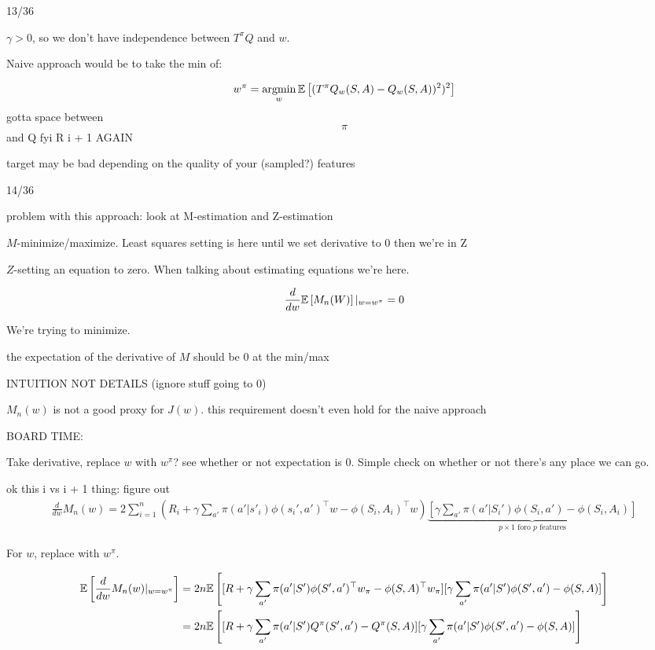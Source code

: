 \documentclass[11pt]{article}
\begin{document}
13/36

$\gamma > 0$, so we don't have independence between $T^\pi Q$ and $w$.

Naive approach would be to take the min of:

$$w^\pi = \operatorname*{argmin}_w \mathbb{E}\left[ (T^\pi Q_w(S,A) - Q_w(S,A))^2)^2 \right]$$
gotta space between $$\pi$$ and Q fyi
R i + 1 AGAIN


target may be bad depending on the quality of your (sampled?) features

14/36

problem with this approach: look at M-estimation and Z-estimation




$M$-minimize/maximize. Least squares setting is here until we set derivative to 0 then we're in Z

$Z$-setting an equation to zero. When talking about estimating equations we're here.


$$\frac{d}{dw}\mathbb{E}\left[ M_n(W) \right]|_{w=w^\pi} = 0$$

We're trying to minimize.

the expectation of the derivative of $M$ should be 0 at the min/max

INTUITION NOT DETAILS (ignore stuff going to 0)

$M_n(w)$ is not a good proxy for $J(w)$.
this requirement doesn't even hold for the naive approach



BOARD TIME:

Take derivative, replace $w$ with $w^\pi$? see whether or not expectation is 0. Simple check on whether or not there's any place we can go.

ok this i vs i + 1 thing: figure out
\begin{align*}
\frac{d}{dw}M_n(w) = 2\sum_{i=1}^n\left(R_{i} + \gamma \sum_{a'} \pi(a'|s'_{i})\phi(s_i', a')^\top w - \phi(S_i, A_i)^\top w \right)\underbrace{\left[\gamma \sum_{a'} \pi(a'|S_i')\phi(S_i, a') - \phi(S_i, A_i)\right]}_{\text{$p \times 1$ foro $p$ features}}
\end{align*}

For $w$, replace with $w^\pi$.

\begin{align*}
\mathbb{E}\left[ \frac{d}{dw} M_n(w) |_{w=w^\pi} \right] &=2n \mathbb{E}\left[ [R + \gamma \sum_{a'} \pi(a'|S')\phi(S',a')^\top w_\pi - \phi(S,A)^\top w_\pi][\gamma \sum_{a'} \pi(a'|S')\phi(S',a') - \phi(S,A)] \right] \\
&= 2n\mathbb{E}\left[ [R + \gamma \sum_{a'} \pi(a'|S')Q^\pi(S', a') - Q^\pi(S, A)][\gamma \sum_{a'} \pi(a'|S')\phi(S',a') - \phi(S,A)] \right]
\end{align*}
\end{document}
